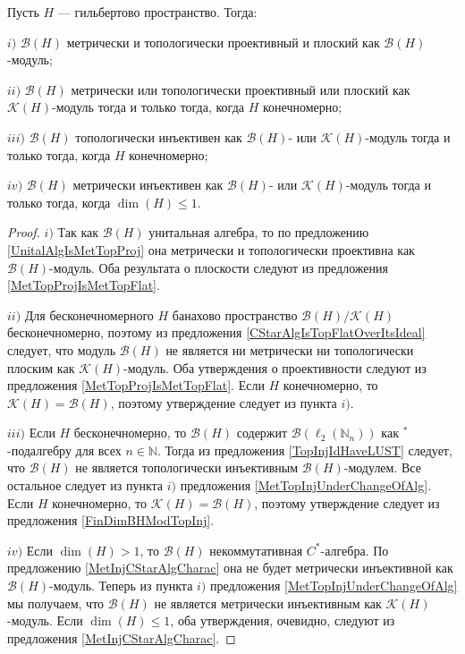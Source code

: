\begin{proposition}\label{KHAndBHModBH} Пусть $H$ --- гильбертово пространство. Тогда:

$i)$ $\mathcal{B}(H)$ метрически и топологически проективный и плоский как $\mathcal{B}(H)$-модуль;

$ii)$ $\mathcal{B}(H)$ метрически или топологически проективный или плоский как $\mathcal{K}(H)$-модуль тогда и только тогда, когда $H$ конечномерно;

$iii)$ $\mathcal{B}(H)$ топологически инъективен как $\mathcal{B}(H)$- или $\mathcal{K}(H)$-модуль тогда и только тогда, когда $H$ конечномерно;

$iv)$ $\mathcal{B}(H)$ метрически инъективен как $\mathcal{B}(H)$- или $\mathcal{K}(H)$-модуль тогда и только тогда, когда $\dim(H)\leq 1$.
\end{proposition}
\begin{proof} $i)$ Так как $\mathcal{B}(H)$ унитальная алгебра, то по предложению \ref{UnitalAlgIsMetTopProj} она метрически и топологически проективна как $\mathcal{B}(H)$-модуль. Оба результата о плоскости следуют из предложения \ref{MetTopProjIsMetTopFlat}.

$ii)$ Для бесконечномерного $H$ банахово пространство $\mathcal{B}(H)/\mathcal{K}(H)$ бесконечномерно, поэтому из предложения  \ref{CStarAlgIsTopFlatOverItsIdeal} следует, что модуль $\mathcal{B}(H)$ не является ни метрически ни топологически плоским как $\mathcal{K}(H)$-модуль. Оба утверждения о проективности следуют из предложения \ref{MetTopProjIsMetTopFlat}. Если $H$ конечномерно, то $\mathcal{K}(H)=\mathcal{B}(H)$, поэтому утверждение следует из пункта $i)$.

$iii)$ Если $H$ бесконечномерно, то $\mathcal{B}(H)$ содержит $\mathcal{B}(\ell_2(\mathbb{N}_n))$ как ${}^*$-подалгебру для всех $n\in\mathbb{N}$. Тогда из предложения \ref{TopInjIdHaveLUST} следует, что $\mathcal{B}(H)$ не является топологически инъективным $\mathcal{B}(H)$-модулем. Все остальное следует из пункта $i)$ предложения \ref{MetTopInjUnderChangeOfAlg}. Если $H$ конечномерно, то $\mathcal{K}(H)=\mathcal{B}(H)$, поэтому утверждение следует из предложения \ref{FinDimBHModTopInj}.

$iv)$ Если $\dim(H)>1$, то $\mathcal{B}(H)$ некоммутативная $C^*$-алгебра. По предложению \ref{MetInjCStarAlgCharac} она не будет метрически инъективной как $\mathcal{B}(H)$-модуль. Теперь из пункта $i)$ предложения \ref{MetTopInjUnderChangeOfAlg} мы получаем, что $\mathcal{B}(H)$ не является метрически инъективным как $\mathcal{K}(H)$-модуль. Если $\dim(H)\leq 1$, оба утверждения, очевидно, следуют из предложения \ref{MetInjCStarAlgCharac}.
\end{proof}

